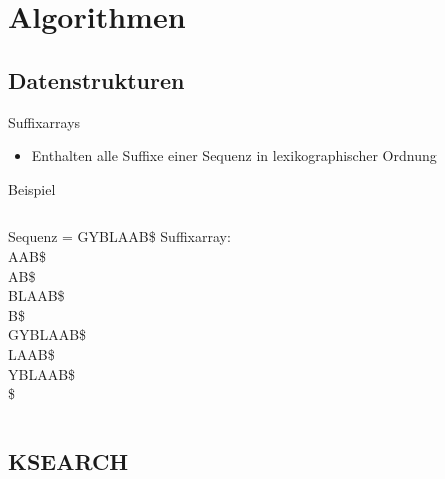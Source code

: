 \documentclass[aspectratio=1610]{beamer}
\begin{document}
\section{Algorithmen}

\subsection{Datenstrukturen}

\begin{frame}{Suffixarrays}
  \begin{itemize}
    \item Enthalten alle Suffixe einer Sequenz in lexikographischer Ordnung
  \end{itemize}
  \begin{block}{Beispiel}
    \begin{columns}
        Sequenz = GYBLAAB\$
      \scriptsize{}
        Suffixarray:\\
        AAB\$\\
        AB\$\\
        BLAAB\$\\
        B\$\\
        GYBLAAB\$\\
        LAAB\$\\
        YBLAAB\$\\
        \$\\
      \normalsize
    \end{columns}
  \end{block}
\end{frame}

\subsection{KSEARCH}
\end{document}
